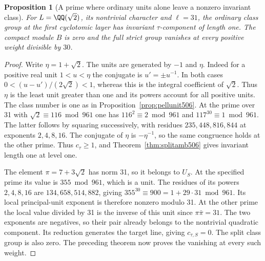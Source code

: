 \documentclass[a4paper,11pt]{article}
\newtheorem{proposition}{Proposition}[section]
\theoremstyle{definition}
\theoremstyle{remark}
\numberwithin{equation}{section}
\begin{document}
\begin{proposition}[A prime where ordinary units alone leave a nonzero invariant class]\leavevmode
\label{prop:thirtyone507}
For \(L=\QQ(\sqrt2)\), its nontrivial character and \(\ell=31\),
the ordinary class group at the first cyclotomic layer has
invariant \(\tau\)-component of length one. The compact module
\(B\) is zero and the full strict group vanishes at every positive
weight divisible by \(30\).
\end{proposition}
\begin{proof}
Write \(\eta=1+\sqrt2\). The units are generated by \(-1\)
and \(\eta\). Indeed for a positive real unit \(1<u<\eta\)
the conjugate is \(u'=\pm u^{-1}\). In both cases
\(0<(u-u')/(2\sqrt2)<1\), whereas this is the integral
coefficient of \(\sqrt2\). Thus \(\eta\) is the least unit
greater than one and its powers account for all positive units.
The class number is one as in Proposition~\ref{prop:pellunit506}.
At the prime over 31 with \(\sqrt2\equiv116\bmod961\) one has
\(116^2\equiv2\bmod961\) and \(117^{30}\equiv1\bmod961\).
The latter follows by squaring successively, with residues
\(235,448,816,844\) at exponents \(2,4,8,16\).
The conjugate of \(\eta\) is \(-\eta^{-1}\), so the same
congruence holds at the other prime. Thus \(c_\tau\ge1\), and
Theorem~\ref{thm:splitamb506} gives invariant length one at
level one.

The element \(\pi=7+3\sqrt2\) has norm 31, so it belongs to
\(U_S\). At the specified prime its value is \(355\bmod961\),
which is a unit. The residues of its powers \(2,4,8,16\)
are \(134,658,514,882\), giving \(355^{30}\equiv900
=1+29\cdot31\bmod961\). Its local principal-unit exponent
is therefore nonzero modulo 31. At the other prime the
local value divided by 31 is the inverse of this unit since
\(\pi\bar\pi=31\). The two exponents are negatives, so their
pair already belongs to the nontrivial quadratic component.
Its reduction generates the target line, giving \(c_{\tau,S}=0\).
The split class group is also zero. The preceding theorem
now proves the vanishing at every such weight.
\end{proof}
\end{document}
